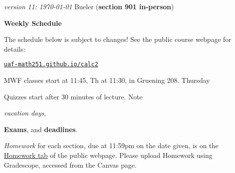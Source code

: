 \documentclass[12pt]{article}
\newcommand{\vacinline}[1]{{\color{OliveGreen} \textsl{#1}}}
\newcommand{\vac}[1]{\strut {\small {\vacinline{#1}}}}
\newcommand{\due}[1]{\strut {\color{BrickRed} \textsl{#1}}}
\newcommand{\dl}[1]{{\small \color{Purple} \textbf{#1}}}
\newcommand{\ee}[1]{\strut {\color{Blue} \textbf{#1}}}
\newcommand{\qq}[1]{\strut {\color{RedOrange} #1}}
\begin{document}
\noindent\footnotesize \emph{version 11: \today} \normalsize \hfill Bueler (\textbf{section 901 in-person})

\bigskip
\centerline{\Large \textbf{Weekly Schedule}}

\bigskip
The schedule below is subject to changes!  See the public course webpage for details:

\medskip

\centerline{\href{https://uaf-math251.github.io/calc2/}{\texttt{uaf-math251.github.io/calc2}}}

\noindent MWF classes start at 11:45, Th at 11:30, in Gruening 208.  Thursday \qq{Quizzes} start after 30 minutes of lecture.  Note \vac{vacation days}, \ee{Exams}, and \dl{deadlines}.  \due{Homework} for each section, due at 11:59pm on the date given, is on the \href{https://uaf-math251.github.io/calc2/}{Homework tab} of the public webpage.  Please upload Homework using Gradescope, accessed from the Canvas page.

\bigskip
\end{document}
